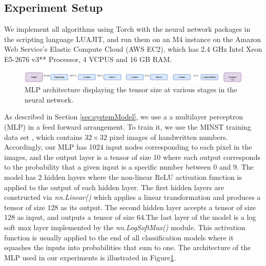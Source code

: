 \documentclass[conference]{IEEEtran}
\begin{document}
\subsection{Experiment Setup}
We implement all algorithms using Torch with the neural network packages in the scripting language LUAJIT, and run them on an M4
instance on the Amazon Web Service's Elastic Compute Cloud (AWS EC2), which has
2.4 GHz Intel Xeon E5-2676 v3** Processor, 4 VCPUS and 16 GB RAM.
\begin{figure}[t]
\centering
\includegraphics[width = 2 \columnwidth, keepaspectratio]{MLPArchitecture}
\caption{MLP architecture displaying the tensor size at various stages in the neural network. }
\label{fig:MLPArch}
\end{figure}
As described in Section \ref{sec:systemModel}, we use a 
a multilayer perceptron (MLP) in a feed forward arrangement. To train it, we use the MINST training data set \cite{deng2012mnist}, which contains 
$32\times 32$ pixel images of handwritten numbers. Accordingly, our MLP has 1024 input nodes
corresponding to each pixel in the images, and the output layer is a tensor of size 10 where each output corresponds to the probability
that a given input is a specific number
between 0 and 9.  The model has 2 hidden layers where the non-linear ReLU activation function is applied to the
output of each hidden layer.  The first hidden layers are constructed via \textit{nn.Linear()} which applies a linear transformation
and produces a tensor of size 128 as its output. The second hidden layer accepts a tensor of size 128 as input, and outputs a tensor of
size 64.The last layer of the model is a log soft max layer implemented by the \textit{nn.LogSoftMax()} module.  This activation
function is usually applied to the end of all classification models where it squashes the inputs into probabilities that sum to one.
The architecture of the MLP used in our experiments is illustrated in Figure\ref{fig:MLPArch}.



\end{document}
